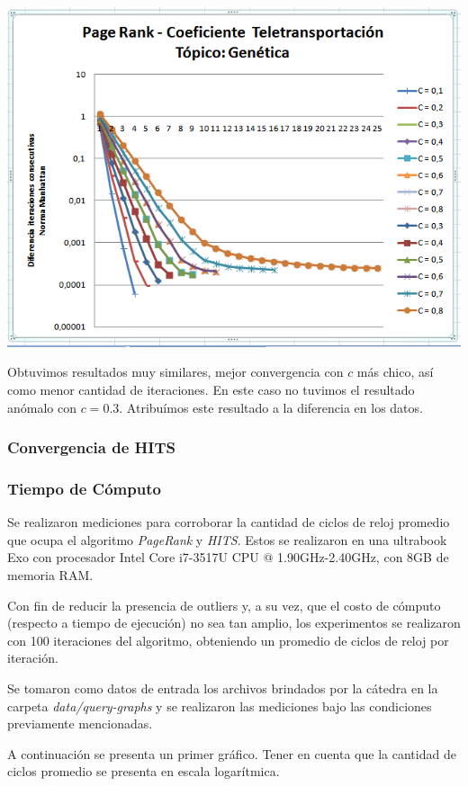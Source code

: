 	\par 
	\begin{center}
		\includegraphics[scale=0.6]{./img/page_rank_variacion_coef_teletransportacion_genetica.png}
	\end{center}
	\par 

	Obtuvimos resultados muy similares, mejor convergencia con $c$ más chico, así como menor cantidad de iteraciones. En este caso no tuvimos el resultado anómalo con $c=0.3$. Atribuímos este resultado a la diferencia en los datos.




\subsubsection{Convergencia de HITS}

\subsubsection{Tiempo de Cómputo}	
Se realizaron mediciones para corroborar la cantidad de ciclos de reloj promedio que ocupa el algoritmo \textit{PageRank} y \textit{HITS}. Estos se realizaron en una ultrabook Exo con procesador Intel Core i7-3517U CPU @ 1.90GHz-2.40GHz, con 8GB de memoria RAM.  
\par 
Con fin de reducir la presencia de outliers y, a su vez, que el costo de cómputo (respecto a tiempo de ejecución) no sea tan amplio, los experimentos se realizaron con 100 iteraciones del algoritmo, obteniendo un promedio de ciclos de reloj por iteración.
\par 
Se tomaron como datos de entrada los archivos brindados por la cátedra en la carpeta \textit{data/query-graphs} y se realizaron las mediciones bajo las condiciones previamente mencionadas.
\par 
A continuación se presenta un primer gráfico. Tener en cuenta que la cantidad de ciclos promedio se presenta en escala logarítmica. 

